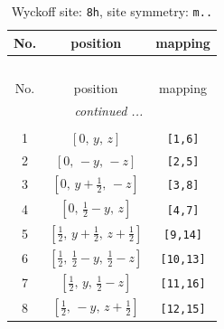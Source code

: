\documentclass[fleqn,8pt]{jsarticle}
\begin{document}
\begin{longtable}{ccc}
\caption{Wyckoff site: {\tt 8h}, site symmetry: {\tt m..}}
 \\
 \hline \hline
No. & position & mapping \\ \hline \endfirsthead

\multicolumn{2}{l}{\tablename\ \thetable{}} \\
 \hline \hline
No. & position & mapping \\ \hline \endhead

 \hline \hline
\multicolumn{2}{r}{\footnotesize\it continued ...} \\ \endfoot

 \hline \hline
\multicolumn{2}{r}{} \\ \endlastfoot

1 & $\left[ 0,\, y,\, z \right]$ & {\tt [1,6]} \\ \hline
2 & $\left[ 0,\, - y,\, - z \right]$ & {\tt [2,5]} \\ \hline
3 & $\left[ 0,\, y + \frac{1}{2},\, - z \right]$ & {\tt [3,8]} \\ \hline
4 & $\left[ 0,\, \frac{1}{2} - y,\, z \right]$ & {\tt [4,7]} \\ \hline
5 & $\left[ \frac{1}{2},\, y + \frac{1}{2},\, z + \frac{1}{2} \right]$ & {\tt [9,14]} \\ \hline
6 & $\left[ \frac{1}{2},\, \frac{1}{2} - y,\, \frac{1}{2} - z \right]$ & {\tt [10,13]} \\ \hline
7 & $\left[ \frac{1}{2},\, y,\, \frac{1}{2} - z \right]$ & {\tt [11,16]} \\ \hline
8 & $\left[ \frac{1}{2},\, - y,\, z + \frac{1}{2} \right]$ & {\tt [12,15]} \\
\end{longtable}
\renewcommand{\arraystretch}{1.2}
\end{document}
